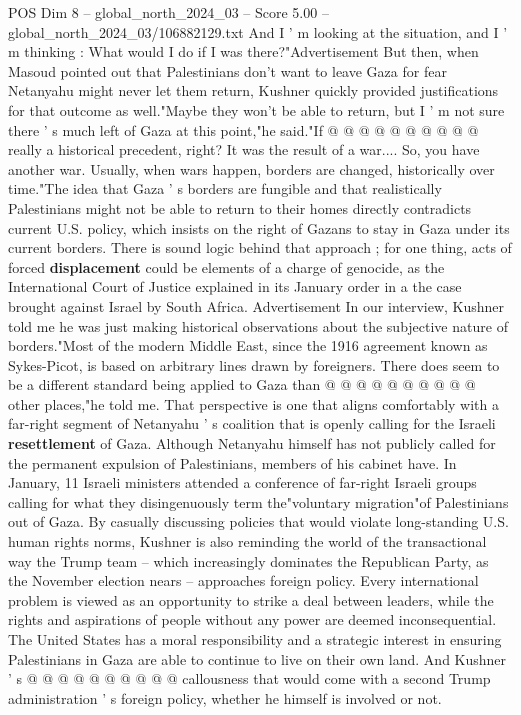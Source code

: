 \begin{textsample}{POS Dim 8 – global\_north\_2024\_03 – Score 5.00 – global\_north\_2024\_03/106882129.txt}
And I ' m looking at the situation, and I ' m thinking : What would I do if I was there?"Advertisement But then, when Masoud pointed out that Palestinians don't want to leave Gaza for fear Netanyahu might never let them return, Kushner quickly provided justifications for that outcome as well."Maybe they won't be able to return, but I ' m not sure there ' s much left of Gaza at this point,"he said."If @ @ @ @ @ @ @ @ @ @ really a historical precedent, right?
It was the result of a war....
So, you have another war.
Usually, when wars happen, borders are changed, historically over time."The idea that Gaza ' s borders are fungible and that realistically Palestinians might not be able to return to their homes directly contradicts current U.S. policy, which insists on the right of Gazans to stay in Gaza under its current borders.
There is sound logic behind that approach ; for one thing, acts of forced \textbf{displacement} could be elements of a charge of genocide, as the International Court of Justice explained in its January order in a the case brought against Israel by South Africa.
Advertisement In our interview, Kushner told me he was just making historical observations about the subjective nature of borders."Most of the modern Middle East, since the 1916 agreement known as Sykes-Picot, is based on arbitrary lines drawn by foreigners.
There does seem to be a different standard being applied to Gaza than @ @ @ @ @ @ @ @ @ @ other places,"he told me.
That perspective is one that aligns comfortably with a far-right segment of Netanyahu ' s coalition that is openly calling for the Israeli \textbf{resettlement} of Gaza.
Although Netanyahu himself has not publicly called for the permanent expulsion of Palestinians, members of his cabinet have.
In January, 11 Israeli ministers attended a conference of far-right Israeli groups calling for what they disingenuously term the"voluntary migration"of Palestinians out of Gaza.
By casually discussing policies that would violate long-standing U.S. human rights norms, Kushner is also reminding the world of the transactional way the Trump team -- which increasingly dominates the Republican Party, as the November election nears -- approaches foreign policy.
Every international problem is viewed as an opportunity to strike a deal between leaders, while the rights and aspirations of people without any power are deemed inconsequential.
The United States has a moral responsibility and a strategic interest in ensuring Palestinians in Gaza are able to continue to live on their own land.
And Kushner ' s @ @ @ @ @ @ @ @ @ @ callousness that would come with a second Trump administration ' s foreign policy, whether he himself is involved or not.

\end{textsample}
